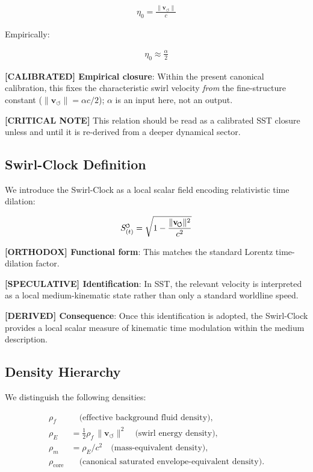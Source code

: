 \documentclass[11pt]{article}
\theoremstyle{definition}
\theoremstyle{plain}
\theoremstyle{remark}
\newcommand{\swirlarrow}{\mathchoice{\mkern-2mu\scriptstyle\boldsymbol{\circlearrowleft}}{\mkern-2mu\scriptstyle\boldsymbol{\circlearrowleft}}{\mkern-2mu\scriptscriptstyle\boldsymbol{\circlearrowleft}}{\mkern-2mu\scriptscriptstyle\boldsymbol{\circlearrowleft}}}
\newcommand{\rhoF}{{\rho_{\!f}}}
\newcommand{\rhoE}{\rho_{\!E}}
\newcommand{\rhoM}{\rho_{\!m}}
\newcommand{\rhocore}{\rho_{\mathrm{core}}}
\newcommand{\SwirlClock}{{S_{(t)}^{\swirlarrow}}}
\newcommand{\vnorm}{\lVert \mathbf{v}_{\!\boldsymbol{\circlearrowleft}} \rVert}
\begin{document}
        \begin{align}
            \eta_0 = \frac{\vnorm}{c}
        \end{align}
        
        Empirically:
        
        \begin{align}
            \eta_0 \approx \frac{\alpha}{2}
        \end{align}
        
        \textbf{[CALIBRATED] Empirical closure}: Within the present canonical calibration, this fixes the characteristic swirl velocity \emph{from} the fine-structure constant ($\vnorm=\alpha c/2$); $\alpha$ is an input here, not an output.

        \textbf{[CRITICAL NOTE]} This relation should be read as a calibrated SST closure unless and until it is re-derived from a deeper dynamical sector.
    
    \subsection{Swirl-Clock Definition}
        
        We introduce the Swirl-Clock as a local scalar field encoding relativistic time dilation:
        
        \begin{align}
            \SwirlClock = \sqrt{1 - \frac{\vnorm^2}{c^2}}
            \label{eq:swirl_clock}
        \end{align}
        
        \textbf{[ORTHODOX] Functional form}: This matches the standard Lorentz time-dilation factor.

        \textbf{[SPECULATIVE] Identification}: In SST, the relevant velocity is interpreted as a local medium-kinematic state rather than only a standard worldline speed.

        \textbf{[DERIVED] Consequence}: Once this identification is adopted, the Swirl-Clock provides a local scalar measure of kinematic time modulation within the medium description.
    
    \subsection{Density Hierarchy}
        
        We distinguish the following densities:
        
        \begin{align}
            \rhoF &\quad \text{(effective background fluid density)}, \\
            \rhoE &= \tfrac12 \rhoF \, \vnorm^2 \quad \text{(swirl energy density)}, \\
            \rhoM &= \rhoE / c^2 \quad \text{(mass-equivalent density)}, \\
            \rhocore &\quad \text{(canonical saturated envelope-equivalent density)}.
        \end{align}
\end{document}
